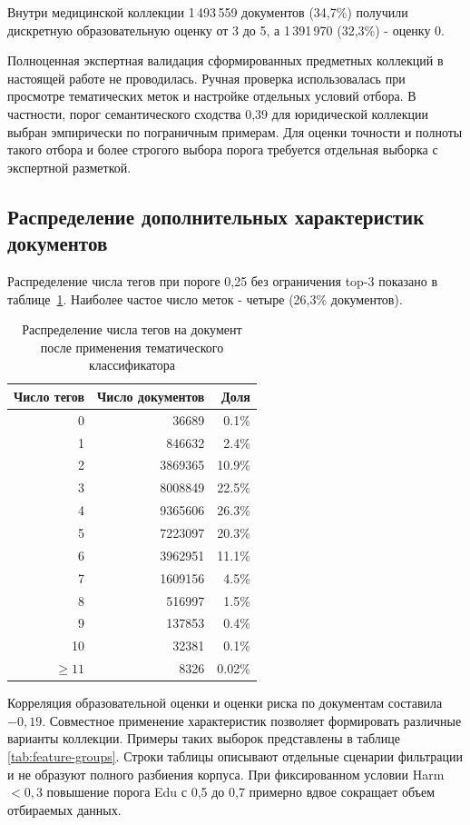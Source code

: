 \documentclass[12pt,a4paper]{article}
\begin{document}
Внутри медицинской коллекции 1\,493\,559 документов (34,7\%) получили
дискретную образовательную оценку от 3 до 5, а 1\,391\,970 (32,3\%) - оценку 0.

Полноценная экспертная валидация сформированных предметных коллекций
в настоящей работе не проводилась. Ручная проверка использовалась при просмотре
тематических меток и настройке отдельных условий отбора.
В частности, порог семантического сходства 0,39 для юридической коллекции выбран
эмпирически по пограничным примерам. Для оценки точности и полноты такого отбора
и более строгого выбора порога требуется отдельная выборка с экспертной разметкой.

\subsection{Распределение дополнительных характеристик документов}

Распределение числа тегов при пороге 0,25 без ограничения top-3 показано
в таблице~\ref{tab:tags-per-doc}. Наиболее частое число меток - четыре (26,3\% документов).


\begin{table}[h]
\centering
\caption{Распределение числа тегов на документ после применения тематического классификатора}
\label{tab:tags-per-doc}
\begin{tabular}{rrr}
\toprule
Число тегов & Число документов & Доля \\
\midrule
0 & 36689 & 0.1\% \\
1 & 846632 & 2.4\% \\
2 & 3869365 & 10.9\% \\
3 & 8008849 & 22.5\% \\
4 & 9365606 & 26.3\% \\
5 & 7223097 & 20.3\% \\
6 & 3962951 & 11.1\% \\
7 & 1609156 & 4.5\% \\
8 & 516997 & 1.5\% \\
9 & 137853 & 0.4\% \\
10 & 32381 & 0.1\% \\
$\geq 11$ & 8326 & 0.02\% \\
\bottomrule
\end{tabular}
\end{table}

Корреляция образовательной оценки и оценки риска по документам составила $-0{,}19$.
Совместное применение характеристик позволяет формировать различные варианты коллекции. 
Примеры таких выборок представлены в таблице \ref{tab:feature-groups}. 
Строки таблицы описывают отдельные сценарии фильтрации и не образуют полного разбиения корпуса.
При фиксированном условии Harm $<0{,}3$ повышение порога Edu с 0,5 до 0,7
примерно вдвое сокращает объем отбираемых данных.
\end{document}
